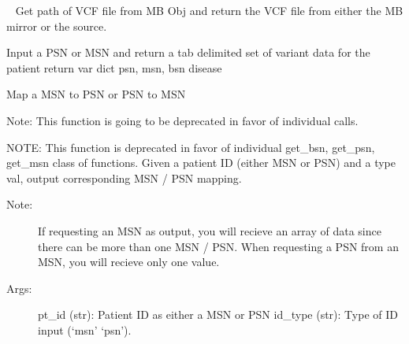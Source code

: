 \documentclass[letterpaper,10pt,english]{sphinxmanual}
\begin{document}
\begin{fulllineitems}
\begin{fulllineitems}
\end{fulllineitems}


\begin{fulllineitems}
\label{\detokenize{matchbox_api_utils:matchbox_api_utils.MatchData.get_seq_datafile}}~
Get path of VCF file from MB Obj and return the VCF file from either the MB mirror or the source.

\end{fulllineitems}


\begin{fulllineitems}
\label{\detokenize{matchbox_api_utils:matchbox_api_utils.MatchData.get_variant_report}}
Input a PSN or MSN and return a tab delimited set of variant data for the patient
return var dict
psn, msn, bsn
disease

\end{fulllineitems}


\begin{fulllineitems}
\label{\detokenize{matchbox_api_utils:matchbox_api_utils.MatchData.map_msn_psn}}
Map a MSN to PSN or PSN to MSN

Note: This function is going to be deprecated in favor of individual calls.

NOTE: This function is deprecated in favor of individual get\_bsn, get\_psn,
get\_msn class of functions.
Given a patient ID (either MSN or PSN) and a type val, output corresponding
MSN / PSN mapping.
\begin{description}
\item[{Note:}] \leavevmode
If requesting an MSN as output, you will recieve an array of data since
there can be more than one MSN / PSN.  When requesting a PSN from an
MSN, you will recieve only one value.

\item[{Args:}] \leavevmode
pt\_id (str): Patient ID as either a MSN or PSN
id\_type (str): Type of ID input (‘msn’ \textbar{} ‘psn’).


\end{description}
\end{fulllineitems}
\end{fulllineitems}
\end{document}
